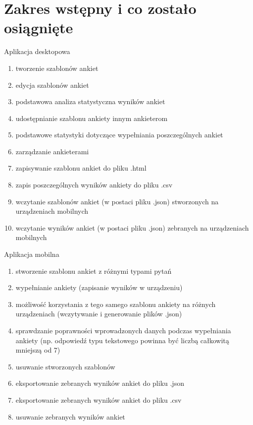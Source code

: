 \documentclass[a4paper,10pt]{beamer}
\begin{document}
	\section{Zakres wstępny i co zostało osiągnięte}
	
	
	\begin{frame}{Aplikacja desktopowa}
		
		\begin{enumerate}
			\item tworzenie szablonów ankiet
			\item edycja szablonów ankiet
			\item podstawowa analiza statystyczna wyników ankiet
			\item udostępnianie szablonu ankiety innym ankieterom
			\item podstawowe statystyki dotyczące wypełniania poszczególnych ankiet
			\item zarządzanie ankieterami
			\item zapisywanie szablonu ankiet do pliku .html
			\item zapis poszczególnych wyników ankiety do pliku .csv
			\item wczytanie szablonów ankiet (w postaci pliku .json) stworzonych na urządzeniach mobilnych
			\item wczytanie wyników ankiet (w postaci pliku .json) zebranych na urządzeniach mobilnych
			
		\end{enumerate}
	\end{frame}
	
	\begin{frame}{Aplikacja mobilna}
		\begin{enumerate}
			\item	stworzenie szablonu ankiet z różnymi typami pytań 
			\item	wypełnianie ankiety (zapisanie wyników w urządzeniu)
			\item	możliwość korzystania z tego samego szablonu ankiety na różnych urządzeniach (wczytywanie i generowanie plików .json)
			\item	sprawdzanie poprawności wprowadzonych danych podczas wypełniania ankiety (np. odpowiedź typu tekstowego powinna być liczbą całkowitą mniejszą od 7) 
			\item	usuwanie stworzonych szablonów
			\item	eksportowanie zebranych wyników ankiet do pliku .json
			\item	eksportowanie zebranych wyników ankiet do pliku .csv
			\item	usuwanie zebranych wyników ankiet		
		\end{enumerate}
	\end{frame}
	
\end{document}
